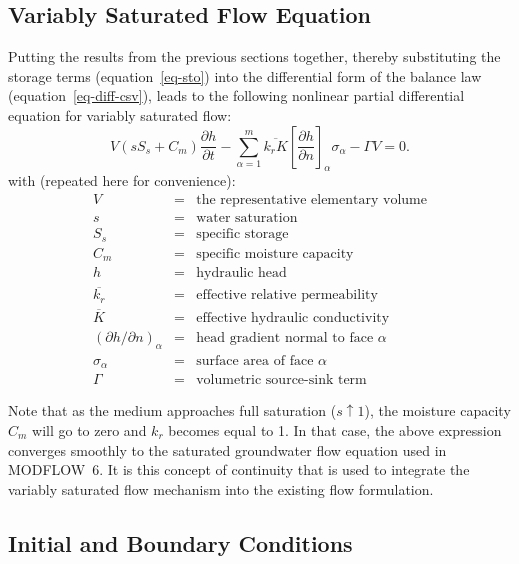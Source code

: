 \documentclass[fleqn]{article}
\begin{document}
\subsection{Variably Saturated Flow Equation}
Putting the results from the previous sections together, thereby
substituting the storage terms (equation~\ref{eq-sto}) into the 
differential form of the balance law (equation~\ref{eq-diff-csv}), 
leads to the following nonlinear partial differential equation for 
variably saturated flow:
\begin{equation}  
  V
  \left(
    s S_s + C_m
  \right)
  \frac{\partial h}{\partial t} -
  \sum_{\alpha=1}^{m} \overline{k_r K}
  \left[\frac{\partial h}{\partial n}\right]_\alpha \sigma_\alpha -
  \Gamma V = 0.
  \label{eq-unsat-flow}
\end{equation}
with (repeated here for convenience):
\begin{eqnarray*}
  V &=& \text{the representative elementary volume} \\
  s &=& \text{water saturation} \\
  S_s &=& \text{specific storage} \\
  C_m &=& \text{specific moisture capacity} \\
  h &=& \text{hydraulic head} \\
  \overline{k_r} &=& \text{effective relative permeability} \\
  \overline{K} &=& \text{effective hydraulic conductivity} \\
  (\partial h/\partial n)_\alpha &=& \text{head gradient normal to face $\alpha$} \\
  \sigma_\alpha &=& \text{surface area of face $\alpha$} \\
  \Gamma &=& \text{volumetric source-sink term}
\end{eqnarray*}

Note that as the medium approaches full saturation ($s\uparrow1$), 
the moisture capacity $C_m$ will go to zero and $k_r$ becomes
equal to 1. In that case, the above expression converges smoothly
to the saturated groundwater flow equation used in MODFLOW~6.
It is this concept of continuity that is used to integrate the 
variably saturated flow mechanism into the existing flow formulation.


\subsection{Initial and Boundary Conditions}\label{sec-boundary-conditions}
\end{document}

